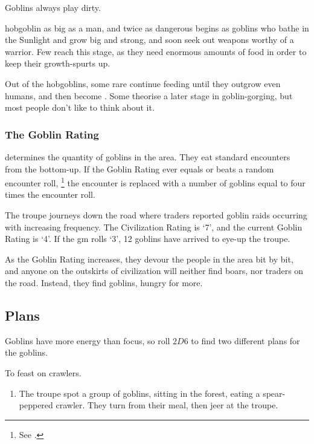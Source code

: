 \begin{multicols}{2}
Goblins always play dirty.


  {hobgoblin}%
  {as big as a man, and twice as dangerous}%
begins as goblins who bathe in the Sunlight and grow big and strong, and soon seek out weapons worthy of a warrior.
Few reach this stage, as they need enormous amounts of food in order to keep their growth-spurts up.

Out of the hobgoblins, some rare continue feeding until they outgrow even humans, and then become .
Some theorise a later stage in goblin-gorging, but most people don't like to think about it.



\exampleGoblinEnc

\subsubsection{The Goblin Rating}
\label{goblin_rating}
determines the quantity of goblins in the area.
They eat standard encounters from the bottom-up.
If the Goblin Rating ever equals or beats a random encounter roll,%
\footnote{See .}
the encounter is replaced with a number of goblins equal to four times the encounter roll.

\begin{exampletext}
  The troupe journeys down the road where traders reported goblin raids occurring with increasing frequency.
  The Civilization Rating is `7', and the current Goblin Rating is `4'.
  If the \gls{gm} rolls `3', 12 goblins have arrived to eye-up the troupe.
\end{exampletext}

As the Goblin Rating increases, they devour the people in the area bit by bit, and anyone on the outskirts of civilization will neither find boars, nor traders on the road.
Instead, they find goblins, hungry for more.

\subsection{Plans}

Goblins have more energy than focus, so roll $2D6$ to find two different plans for the goblins.

\begin{dlist}
  \item
  To feast on crawlers.
  \begin{enumerate}
    \item
      The troupe spot a group of goblins, sitting in the forest, eating a spear-peppered \gls{crawler}.
    They turn from their meal, then jeer at the troupe.


\end{enumerate}
\end{dlist}
\end{multicols}
